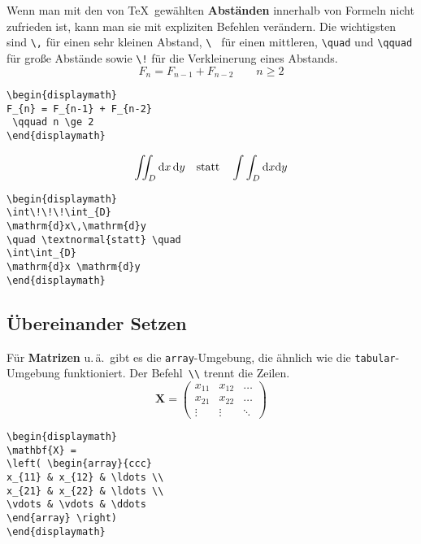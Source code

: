 Wenn man mit den von \TeX\ gewählten \textbf{Abständen}
innerhalb von Formeln nicht zufrieden ist, kann man sie mit
expliziten Befehlen verändern. Die wichtigsten sind
\verb|\,| für einen sehr kleinen Abstand,
\verb*|\ | für einen mittleren,
\verb|\quad| und \verb|\qquad| für große Abstände sowie
\verb|\!| für die Verkleinerung eines Abstands.
\exa
\begin{displaymath}
F_{n} = F_{n-1} + F_{n-2}
 \qquad n \ge 2
\end{displaymath}
\exb
\begin{verbatim}
\begin{displaymath}
F_{n} = F_{n-1} + F_{n-2}
 \qquad n \ge 2
\end{displaymath}
\end{verbatim}
\exc
 
\exa
\begin{displaymath}
\int\!\!\!\int_{D} \mathrm{d}x\,\mathrm{d}y
\quad \textnormal{statt} \quad
\int\int_{D} \mathrm{d}x \mathrm{d}y
\end{displaymath}
\exb
\begin{verbatim}
\begin{displaymath}
\int\!\!\!\int_{D} 
\mathrm{d}x\,\mathrm{d}y
\quad \textnormal{statt} \quad
\int\int_{D} 
\mathrm{d}x \mathrm{d}y
\end{displaymath}
\end{verbatim}
\exc


\subsection{Übereinander Setzen}

Für \textbf{Matrizen} u.\,ä.\ gibt es die
\texttt{array}-Umgebung, die ähnlich wie die
\texttt{tabular}-Umgebung funktioniert.
Der Befehl~\verb|\\| trennt die Zeilen.
\exa
\begin{displaymath}
\mathbf{X} =
\left( \begin{array}{ccc}
x_{11} & x_{12} & \ldots \\
x_{21} & x_{22} & \ldots \\
\vdots & \vdots & \ddots
\end{array} \right)
\end{displaymath}
\exb
\begin{verbatim}
\begin{displaymath}
\mathbf{X} =
\left( \begin{array}{ccc}
x_{11} & x_{12} & \ldots \\
x_{21} & x_{22} & \ldots \\
\vdots & \vdots & \ddots
\end{array} \right)
\end{displaymath}
\end{verbatim}
\exc

